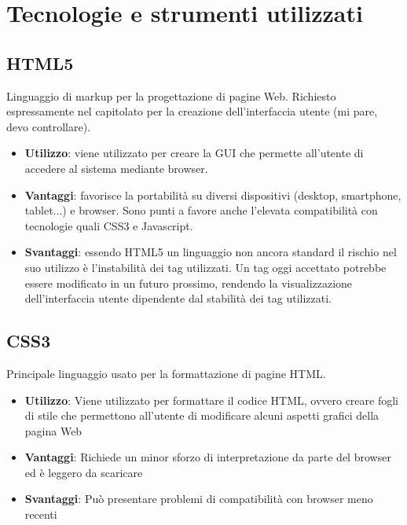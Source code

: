 \documentclass[a4paper,11pt]{article}
\begin{document}
	\section{Tecnologie e strumenti utilizzati}
	\subsection{HTML5}
	Linguaggio di markup per la progettazione di pagine Web. Richiesto espressamente nel capitolato per la creazione dell'interfaccia utente (mi pare, devo controllare).
	\begin{itemize}
		\item\textbf{Utilizzo}: viene utilizzato per creare la GUI che permette all'utente di accedere al sistema mediante browser.
		\item\textbf{Vantaggi}: favorisce la portabilità su diversi dispositivi (desktop, smartphone, tablet...) e browser.
Sono punti a favore anche l'elevata compatibilità con tecnologie quali CSS3 e Javascript.
		\item\textbf{Svantaggi}: essendo HTML5 un linguaggio non ancora standard il rischio nel suo utilizzo è l'instabilità dei tag utilizzati. Un tag oggi accettato potrebbe essere modificato
in un futuro prossimo, rendendo la visualizzazione dell'interfaccia utente dipendente dal stabilità dei tag utilizzati. 
	\end{itemize}
	\subsection{CSS3}
	Principale linguaggio usato per la formattazione di pagine HTML.
	\begin{itemize}
		\item\textbf{Utilizzo}: Viene utilizzato per formattare il codice HTML,
ovvero creare fogli di stile che permettono all'utente di modificare alcuni aspetti grafici della
pagina Web
		\item\textbf{Vantaggi}: Richiede un minor sforzo di interpretazione da parte del browser ed è leggero da scaricare
		\item\textbf{Svantaggi}: Può presentare problemi di compatibilità con browser meno recenti
	\end{itemize}
\end{document}
